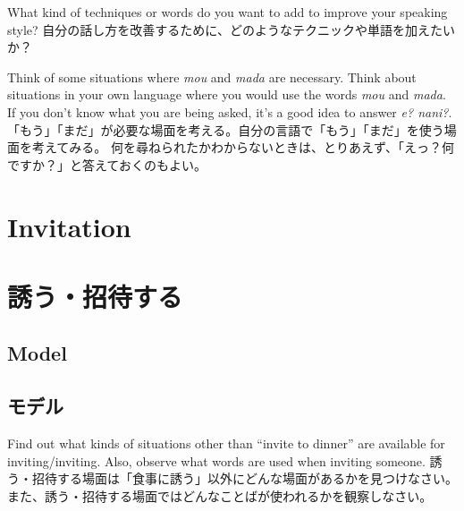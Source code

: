 \documentclass[uplatex,dvipdfmx,b5paper,english,10pt]{jsbook}
\begin{document}
\begin{toiquestion}
\ifEnglish
What kind of techniques or words do you want to add to improve your speaking style?
\else
自分の話し方を改善するために、どのようなテクニックや単語を加えたいか？
\fi
\end{toiquestion}
\begin{toianswer}
\ifEnglish
Think of some situations where {\it mou\/} and {\it mada\/} are necessary.
Think about situations in your own language where you would use the words {\it mou\/} and {\it mada\/}.
If you don't know what you are being asked, it's a good idea to answer {\it e? nani?\/}.
\else
「もう」「まだ」が必要な場面を考える。自分の言語で「もう」「まだ」を使う場面を考えてみる。
何を尋ねられたかわからないときは、とりあえず、「えっ？何ですか？」と答えておくのもよい。
\fi
\end{toianswer}

%

\ifEnglish
  \section{Invitation}
\else
  \section{誘う・招待する}
\fi


\ifEnglish
\subsection{Model}
\else
\subsection{モデル}
\fi

\begin{toiquestion} %
\ifEnglish
Find out what kinds of situations other than ``invite to dinner'' are available for inviting/inviting.
Also, observe what words are used when inviting someone.
\else
誘う・招待する場面は「食事に誘う」以外にどんな場面があるかを見つけなさい。
また、誘う・招待する場面ではどんなことばが使われるかを観察しなさい。
\fi
\end{toiquestion}

\end{document}
